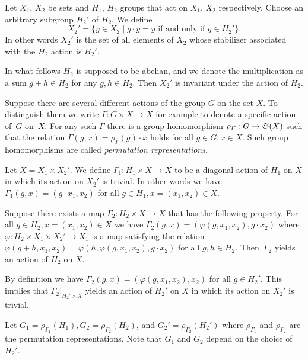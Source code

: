 Let $X_1$, $X_2$ be sets and $H_1$, $H_2$ groups that act on $X_1$, $X_2$ respectively.
Choose an arbitrary subgroup $H_2'$ of $H_2$.
We def\/ine
\begin{equation}\label{eq:apr21_1}
X_2' = \{ y \in X_2 \mid g \cdot y = y \mbox{ if and only if } g \in H_2' \}.
\end{equation}
In other words $X_2'$ is the set of all elements of $X_2$ whose stabilizer
associated with the $H_2$ action is $H_2'$.


In what follows $H_2$ is supposed to be abelian, and we denote the multiplication as a sum $g+h \in H_2$
for any $g, h \in H_2$.
Then $X_2'$ is invariant under the action of $H_2$.

\begin{remark}\label{rem:apr21_2}
Suppose there are several dif\/ferent actions of the group $G$ on the set $X$.
To distinguish them we write
$\varGamma : G \times X \rightarrow X$ for example to denote
a specif\/ic action of~$G$ on~$X$.
For any such $\varGamma$
there is a
group homomorphism $\rho_{\varGamma} : G \rightarrow {\frak S}(X)$ such that
the relation $\varGamma (g,x) = \rho_{\varGamma} (g) \cdot x$ holds
for all $g \in G, x \in X$.
Such group homomorphisms are called {\em permutation representations}.
\end{remark}

Let $X = X_1 \times X_2'$.
We def\/ine $\varGamma_1 : H_1 \times X \rightarrow X$
to be a diagonal action of
$H_1$ on $X$
in which its action on $X_2'$ is trivial.
In other words we have
$\varGamma_1(g, x) = (g \cdot x_1, x_2)$ for all $g \in H_1, x =(x_1,x_2) \in X$.

Suppose there exists a map $\varGamma_2 : H_2 \times X \rightarrow X$
that has the following property.
For all $g \in H_2, x =(x_1,x_2) \in X$ we have
$\varGamma_2(g, x) = (\varphi (g, x_1,x_2), g \cdot x_2)$ where
$\varphi : H_2 \times X_1 \times X_2' \rightarrow X_1$ is a map
satisfying the relation $\varphi (g + h, x_1,x_2) = \varphi (h , \varphi (g, x_1,x_2),g \cdot x_2)$ for all $g,h \in H_2$.
Then~$\varGamma_2$ yields an action of $H_2$ on $X$.

By def\/inition we have
$\varGamma_2(g, x) = (\varphi (g, x_1,x_2), x_2)$ for all $g \in H_2'$.
This implies that $\varGamma_2 |_{H_2' \times X}$ yields an action of $H_2'$ on $X$ in which its action on $X_2'$ is trivial.

Let $G_1 = \rho_{\varGamma_1} (H_1), G_2 = \rho_{\varGamma_2} (H_2)$, and $G_2' = \rho_{\varGamma_2} (H_2')$
where $\rho_{\varGamma_1}$ and $\rho_{\varGamma_2}$ are the permutation representations.
Note that $G_1$ and $G_2$
depend on the choice of $H_2'$.

